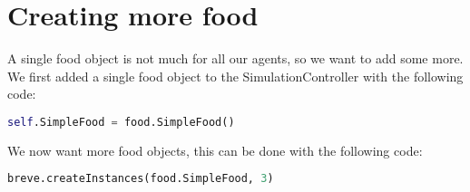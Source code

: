 \section{Creating more food}
A single food object is not much for all our agents, so we want to add some more. We first added a single food object to the SimulationController with the following code:
\begin{lstlisting}[language=Python]
self.SimpleFood = food.SimpleFood()
\end{lstlisting}
We now want more food objects, this can be done with the following code:
\begin{lstlisting}[language=Python]
breve.createInstances(food.SimpleFood, 3)
\end{lstlisting}
